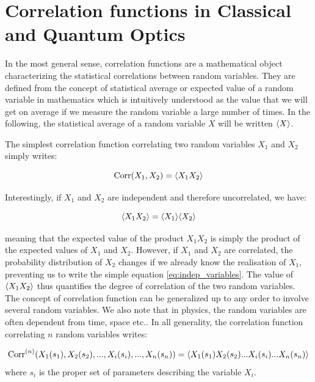 \section{Correlation functions in Classical and Quantum Optics}

In the most general sense, correlation functions are a mathematical object characterizing the statistical correlations between random variables. They are defined from the concept of statistical average or expected value of a random variable in mathematics which is intuitively understood as the value that we will get on average if we measure the random variable a large number of times. In the following, the statistical average of a random variable $X$ will be written $\langle X\rangle$.

The simplest correlation function correlating two random variables $X_1$ and $X_2$ simply writes:

\begin{equation}
    \text{Corr}(X_1,X_2)=\langle X_1 X_2\rangle
\end{equation}

\noindent Interestingly, if $X_1$ and $X_2$ are independent and therefore uncorrelated, we have:

\begin{equation}
    \langle X_1 X_2\rangle = \langle X_1\rangle \langle X_2\rangle
    \label{eq:indep_variables}
\end{equation}

\noindent meaning that the expected value of the product $X_1 X_2$ is simply the product of the expected values of $X_1$ and $X_2$. However, if $X_1$ and $X_2$ are correlated, the probability distribution of $X_2$ changes if we already know the realisation of $X_1$, preventing us to write the simple equation \ref{eq:indep_variables}. The value of $\langle X_1 X_2\rangle$ thus quantifies the degree of correlation of the two random variables. The concept of correlation function can be generalized up to any order to involve several random variables. We also note that in physics, the random variables are often dependent from time, space etc.. In all generality, the correlation function correlating $n$ random variables writes:

\begin{equation}
    \text{Corr}^{(n)}(X_1(s_1),X_2(s_2),...,X_i(s_i),...,X_n(s_n)) = \langle X_1(s_1) X_2(s_2) ... X_i(s_i) ... X_n(s_n)\rangle 
\end{equation}
\noindent where $s_i$ is the proper set of parameters describing the variable $X_i$.

